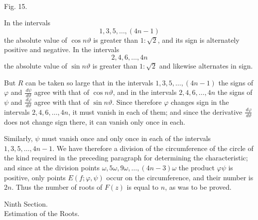 \documentclass[11pt]{article}
\providecommand{\dd}{\,d}
\begin{document}
\begin{center}
\\[-0.2em]
{\small Fig. 15.}
\end{center}


In the intervals
\[
        1,3,5,\ldots,(4n-1)
\]
the absolute value of $\cos n\vartheta$ is greater than $1:\sqrt2$, and its sign is alternately positive and negative. In the intervals
\[
        2,4,6,\ldots,4n
\]
the absolute value of $\sin n\vartheta$ is greater than $1:\sqrt2$ and likewise alternates in sign.

But $R$ can be taken so large that in the intervals $1,3,5,\ldots,(4n-1)$ the signs of $\varphi$ and $\frac{\dd\psi}{\dd\vartheta}$ agree with that of $\cos n\vartheta$, and in the intervals $2,4,6,\ldots,4n$ the signs of $\psi$ and $\frac{\dd\varphi}{\dd\vartheta}$ agree with that of $\sin n\vartheta$. Since therefore $\varphi$ changes sign in the intervals $2,4,6,\ldots,4n$, it must vanish in each of them; and since the derivative $\frac{\dd\varphi}{\dd\vartheta}$ does not change sign there, it can vanish only once in each.

Similarly, $\psi$ must vanish once and only once in each of the intervals $1,3,5,\ldots,4n-1$. We have therefore a division of the circumference of the circle of the kind required in the preceding paragraph for determining the characteristic; and since at the division points $\omega,5\omega,9\omega,\ldots,(4n-3)\omega$ the product $\varphi\psi$ is positive, only points $E(f;\varphi,\psi)$ occur on the circumference, and their number is $2n$. Thus the number of roots of $F(z)$ is equal to $n$, as was to be proved.


\clearpage

\begin{center}
{\large Ninth Section.}\\[0.6em]
{\Large Estimation of the Roots.}
\end{center}
\end{document}
